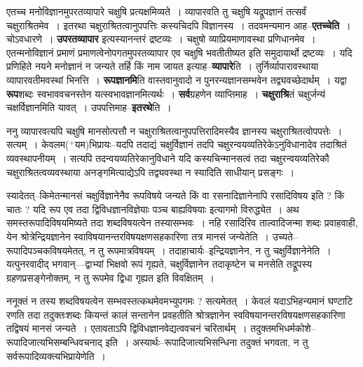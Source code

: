 \documentclass[article,12pt,a4paper]{memoir}
\newcommand{\add}[1]{($^{+}$#1)}
\begin{document}
	एतच्च मनोविज्ञानमुपरतव्यापारे चक्षुषि प्रत्यक्षमिव्यते । व्यापारवति तु चक्षुषि यद्रूपज्ञानं तत्सर्वं चक्षुराश्रितमेव । इतरथा चक्षुराश्रितत्वानुपपत्तिः कस्यचिदपि विज्ञानस्य । तदवमन्यमान आह--\textbf{एतच्चेति} । चोऽवधारणे । \textbf{उपरतव्यापार} इत्यस्यानन्तरं द्रष्टव्यः । चक्षुषो व्याप्रियमाणावस्था प्रणिधानमेव । एतन्मनोविज्ञानं प्रमाणं प्रमाणत्वेनोपगतमुपरतव्यापार एव चक्षुषि भवतीतीष्यत इति समुदायार्थो द्रष्टव्यः । यदि प्रणिहिते नयने मनोज्ञानं न जन्यते तर्हि किं नाम जायत इत्याह--\textbf{व्यापारे}ति । तुर्निर्व्यापारावस्थाया व्यापारवतीमवस्थां भिनत्ति । \textbf{रूपज्ञानमि}ति वास्तवानुवादो न पुनरन्यज्ञानसम्भवेन तद्व्यवच्छेदार्थम् । यद्वा \textbf{रूप}शब्दः स्वभाववचनस्तेन यत्स्वभावज्ञानमित्यर्थः । \textbf{सर्व}ग्रहणेन व्याप्तिमाह । \textbf{चक्षुराश्रि}तं चक्षुर्जन्यं चक्षर्विज्ञानमिति यावत् । उपपत्तिमाह--\textbf{इतरथे}ति ।
	\pend
      

	  \pstart ननु व्यापारवत्यपि चक्षुषि मानसोत्पत्तौ न चक्षुराश्रितत्वानुपपत्तिरादिमस्यैव ज्ञानस्य चक्षुराश्रितत्वोपपत्तेः । सत्यम् । केवलम\add{यम}भिप्रायः--यदपि तदाद्यं चक्षुर्विज्ञानं तदपि चक्षुरन्वयव्यतिरेकेऽनुविधानादेव तदाश्रितं व्यवस्थापनीयम् । सत्यपि तदन्वयव्यतिरेकानुविधाने यदि कस्यचिन्मानसत्वं तदा चक्षुरन्वयव्यतिरेकौ चक्षुराश्रितत्वव्यवस्थाया अनङ्गमित्याद्येऽपि तद्व्यवस्था न स्यादिति साधीयान् प्रसङ्गः ।
	\pend
      

	  \pstart स्यादेतत्--किमेतन्मानसं चक्षुर्विज्ञानेनैव रूपविषये जन्यते किं वा रसनादिज्ञानेनापि रसादिविषय इति ? किं चातः ? यदि रूप एव तदा द्विविधज्ञानविज्ञेयाः पञ्च बाह्यविषयाः इत्यागमो विरुद्ध्येत । अथ समस्तरूपादिविषयमिष्यते तदा शब्दविषयत्वेन तस्यासम्भवः । नहि रसादिरिव ताल्वादिजन्मा शब्दः प्रवाहवाही, येन श्रोत्रेन्द्रियज्ञानेन स्वाविषयानन्तरविषयक्षणसहकारिणा तत्र मानसं जन्येतेति । उच्यते--रूपादिपञ्चकविषयमेतत्, न तु रूपमात्रविषयम् । तदाहाचार्यः--इन्द्रियज्ञानेन, न तु चक्षुर्विज्ञानेनेति । यत्पुनरवादीद् भगवान्—द्वाभ्यां भिक्षवो रूपं गृह्यते, चक्षुर्विज्ञानेन तदाकृष्टेन च मनसेति तद्रूपस्य ग्रहणप्रसङ्गेनोक्तम्, न तु रूपमेव द्विधा गृह्यत इति विवक्षितम् ।
	\pend
      

	  \pstart ननूक्तं न तस्य शब्दविषयत्वेन सम्भवस्तत्कथमेवमभ्युपगमः ? सत्यमेतत् । केवलं यदाऽभिहन्यमानं घण्टाटि रणति तदा तदुक्तःशब्दः कियन्तं कालं सन्तानेन प्रवहतीति श्रोत्रज्ञानेन स्वविषयानन्तरविषयक्षणसहकारिणा तद्विषयं मानसं जन्यते । एतावताऽपि द्विविधज्ञानवेद्यत्ववचनं चरितार्थम् । तदुक्तमभिधर्मकोशे--रूपादिजात्यभिसम्बन्धिवचनाद्  इति । अस्यार्थः--रूपादिजात्यभिसन्धिना तदुक्तं भगवता, न तु \leavevmode{} सर्वरूपादिव्यक्त्यभिप्रायेणेति ।
	\pend
      
\end{document}
